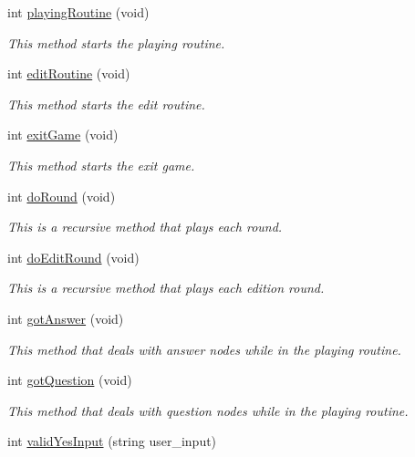 \begin{DoxyCompactItemize}
int \hyperlink{classGameInterface_ac64abd0ec216c442a4cae4d09f94ab0a}{playing\+Routine} (void)
\begin{DoxyCompactList}\small\item\em This method starts the playing routine. \end{DoxyCompactList}\item 
int \hyperlink{classGameInterface_a72f37e45597b372fdbe895c9f8f61fe3}{edit\+Routine} (void)
\begin{DoxyCompactList}\small\item\em This method starts the edit routine. \end{DoxyCompactList}\item 
int \hyperlink{classGameInterface_ab0ded12c364ac64a8362959608201b98}{exit\+Game} (void)
\begin{DoxyCompactList}\small\item\em This method starts the exit game. \end{DoxyCompactList}\item 
int \hyperlink{classGameInterface_a34f3d7f2ba56662cc0108b54b19fc162}{do\+Round} (void)
\begin{DoxyCompactList}\small\item\em This is a recursive method that plays each round. \end{DoxyCompactList}\item 
int \hyperlink{classGameInterface_ad254aa8d489bc420592eae3ed3bc008d}{do\+Edit\+Round} (void)
\begin{DoxyCompactList}\small\item\em This is a recursive method that plays each edition round. \end{DoxyCompactList}\item 
int \hyperlink{classGameInterface_a0a7e8e6ca668c755e8ccc94ff091dd5b}{got\+Answer} (void)
\begin{DoxyCompactList}\small\item\em This method that deals with answer nodes while in the playing routine. \end{DoxyCompactList}\item 
int \hyperlink{classGameInterface_afb911f0c555e8c3ba0f4be8974a49a58}{got\+Question} (void)
\begin{DoxyCompactList}\small\item\em This method that deals with question nodes while in the playing routine. \end{DoxyCompactList}\item 
int \hyperlink{classGameInterface_a1a06b1226a86254b6540ec08d0745009}{valid\+Yes\+Input} (string user\+\_\+input)

\end{DoxyCompactItemize}
